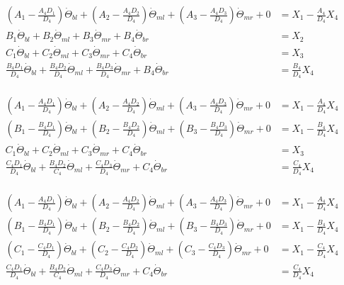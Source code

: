 \documentclass[11pt, landscape]{article}
\begin{document}
\begin{align}
  \left(A_1 - \frac{A_4D_1}{D_4}\right)\dot{\Theta}_{bl} + \left(A_2 - \frac{A_4D_2}{D_4}\right)\dot{\Theta}_{ml} + \left(A_3 - \frac{A_4D_3}{D_4}\right)\dot{\Theta}_{mr} + 0 &= X_1 - \frac{A_4}{D_4}X_4\\
  B_1\dot{\Theta}_{bl} + B_2 \dot{\Theta}_{ml} + B_3 \dot{\Theta}_{mr} + B_4 \dot{\Theta}_{br} &= X_2 \\
  C_1\dot{\Theta}_{bl} + C_2 \dot{\Theta}_{ml} + C_3 \dot{\Theta}_{mr} + C_4 \dot{\Theta}_{br} &= X_3 \\
  \frac{B_4D_1}{D_4}\dot{\Theta}_{bl} + \frac{B_4D_2}{D_4}\dot{\Theta}_{ml} + \frac{B_4D_3}{D_4}\dot{\Theta}_{mr} + B_4 \dot{\Theta}_{br} &= \frac{B_4}{D_4}X_4 \\
\end{align}

\begin{align}
  \left(A_1 - \frac{A_4D_1}{D_4}\right)\dot{\Theta}_{bl} + \left(A_2 - \frac{A_4D_2}{D_4}\right)\dot{\Theta}_{ml} + \left(A_3 - \frac{A_4D_3}{D_4}\right)\dot{\Theta}_{mr} + 0 &= X_1 - \frac{A_4}{D_4}X_4\\
  \left(B_1 - \frac{B_4D_1}{D_4}\right)\dot{\Theta}_{bl} + \left(B_2 - \frac{B_4D_2}{D_4}\right)\dot{\Theta}_{ml} + \left(B_3 - \frac{B_4D_3}{D_4}\right)\dot{\Theta}_{mr} + 0 &= X_1 - \frac{B_4}{D_4}X_4\\
  C_1\dot{\Theta}_{bl} + C_2 \dot{\Theta}_{ml} + C_3 \dot{\Theta}_{mr} + C_4 \dot{\Theta}_{br} &= X_3 \\
  \frac{C_4D_1}{D_4}\dot{\Theta}_{bl} + \frac{B_4D_2}{C_4}\dot{\Theta}_{ml} + \frac{C_4D_3}{D_4}\dot{\Theta}_{mr} + C_4 \dot{\Theta}_{br} &= \frac{C_4}{D_4}X_4 \\
\end{align}

\begin{align}
  \left(A_1 - \frac{A_4D_1}{D_4}\right)\dot{\Theta}_{bl} + \left(A_2 - \frac{A_4D_2}{D_4}\right)\dot{\Theta}_{ml} + \left(A_3 - \frac{A_4D_3}{D_4}\right)\dot{\Theta}_{mr} + 0 &= X_1 - \frac{A_4}{D_4}X_4\\
  \left(B_1 - \frac{B_4D_1}{D_4}\right)\dot{\Theta}_{bl} + \left(B_2 - \frac{B_4D_2}{D_4}\right)\dot{\Theta}_{ml} + \left(B_3 - \frac{B_4D_3}{D_4}\right)\dot{\Theta}_{mr} + 0 &= X_1 - \frac{B_4}{D_4}X_4\\
  \left(C_1 - \frac{C_4D_1}{D_4}\right)\dot{\Theta}_{bl} + \left(C_2 - \frac{C_4D_2}{D_4}\right)\dot{\Theta}_{ml} + \left(C_3 - \frac{C_4D_3}{D_4}\right)\dot{\Theta}_{mr} + 0 &= X_1 - \frac{C_4}{D_4}X_4\\
  \frac{C_4D_1}{D_4}\dot{\Theta}_{bl} + \frac{B_4D_2}{C_4}\dot{\Theta}_{ml} + \frac{C_4D_3}{D_4}\dot{\Theta}_{mr} + C_4 \dot{\Theta}_{br} &= \frac{C_4}{D_4}X_4 \\
\end{align}
\end{document}
